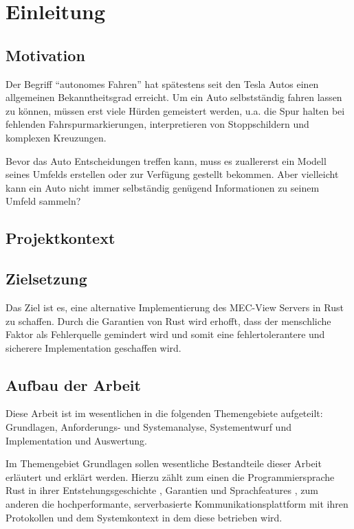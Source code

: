 
\chapter{Einleitung}

\section{Motivation}
Der Begriff \enquote{autonomes Fahren} hat spätestens seit den Tesla Autos einen allgemeinen Bekanntheitsgrad erreicht. Um ein Auto selbstständig fahren lassen zu können, müssen erst viele Hürden gemeistert werden, u.a. die Spur halten bei fehlenden Fahrspurmarkierungen, interpretieren von Stoppschildern und komplexen Kreuzungen. 

Bevor das Auto Entscheidungen treffen kann, muss es zuallererst ein Modell seines Umfelds erstellen oder zur Verfügung gestellt bekommen. Aber vielleicht kann ein Auto nicht immer selbständig genügend Informationen zu seinem Umfeld sammeln? 

\section{Projektkontext}

\section{Zielsetzung}

Das Ziel ist es, eine alternative Implementierung des MEC-View Servers in Rust zu schaffen.
Durch die Garantien  von Rust wird erhofft, dass der menschliche Faktor als Fehlerquelle gemindert wird und somit eine fehlertolerantere und sicherere Implementation geschaffen wird.


\section{Aufbau der Arbeit}

Diese Arbeit ist im wesentlichen in die folgenden Themengebiete aufgeteilt: Grundlagen, Anforderungs- und Systemanalyse, Systementwurf und Implementation und Auswertung.

Im Themengebiet Grundlagen sollen wesentliche Bestandteile dieser Arbeit erläutert und erklärt werden.
Hierzu zählt zum einen die Programmiersprache Rust in ihrer Entstehungsgeschichte , Garantien   und Sprachfeatures , zum anderen die hochperformante, serverbasierte Kommunikationsplattform mit ihren Protokollen  und dem Systemkontext in dem diese betrieben wird.

